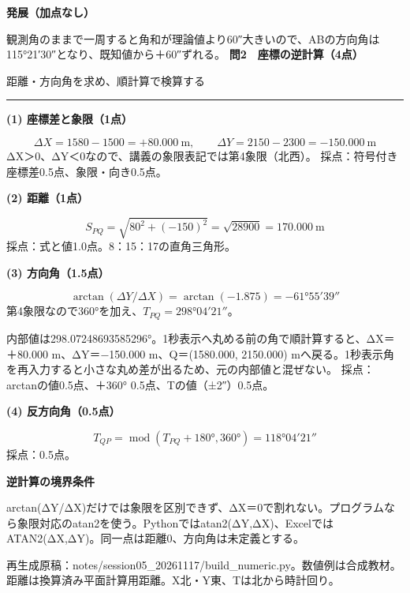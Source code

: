 \documentclass[a4paper,10pt]{article}
\newcommand{\ttl}[2]{{\color{navy}\Large\bfseries #1}\par{\small #2}\par\vspace{2pt}\hrule\vspace{7pt}}
\newcommand{\sub}[1]{\par{\color{navy}\large\bfseries #1}\par}
\newcommand{\note}[1]{{\small\color{blue}#1}\par}
\begin{document}
\sub{発展（加点なし）}
観測角のままで一周すると角和が理論値より60″大きいので、ABの方向角は115°21′30″となり、既知値から＋60″ずれる。
\newpage
\ttl{問2　座標の逆計算（4点）}{距離・方向角を求め、順計算で検算する}
\sub{(1) 座標差と象限（1点）}
\[\Delta X=1580-1500=+80.000\ \mathrm{m},\qquad
\Delta Y=2150-2300=-150.000\ \mathrm{m}\]
ΔX＞0、ΔY＜0なので、講義の象限表記では第4象限（北西）。
\note{採点：符号付き座標差0.5点、象限・向き0.5点。}
\sub{(2) 距離（1点）}
\[S_{PQ}=\sqrt{80^2+(-150)^2}=\sqrt{28900}=170.000\ \mathrm{m}\]
\note{採点：式と値1.0点。8：15：17の直角三角形。}
\sub{(3) 方向角（1.5点）}
\[\arctan(\Delta Y/\Delta X)=\arctan(-1.875)=-61°55′39″\]
第4象限なので360°を加え、$T_{PQ}=298°04′21″$。

内部値は298.07248693585296°。1秒表示へ丸める前の角で順計算すると、ΔX＝＋80.000 m、ΔY＝−150.000 m、Q＝(1580.000, 2150.000) mへ戻る。1秒表示角を再入力すると小さな丸め差が出るため、元の内部値と混ぜない。
\note{採点：arctanの値0.5点、＋360° 0.5点、Tの値（±2″）0.5点。}
\sub{(4) 反方向角（0.5点）}
\[T_{QP}=\operatorname{mod}(T_{PQ}+180°,360°)=118°04′21″\]
\note{採点：0.5点。}
\sub{逆計算の境界条件}
arctan(ΔY/ΔX)だけでは象限を区別できず、ΔX＝0で割れない。プログラムなら象限対応のatan2を使う。Pythonではatan2(ΔY,ΔX)、ExcelではATAN2(ΔX,ΔY)。同一点は距離0、方向角は未定義とする。

\vfill
{\small 再生成原稿：notes/session05\_20261117/build\_numeric.py。数値例は合成教材。距離は換算済み平面計算用距離。X北・Y東、Tは北から時計回り。}
\end{document}
